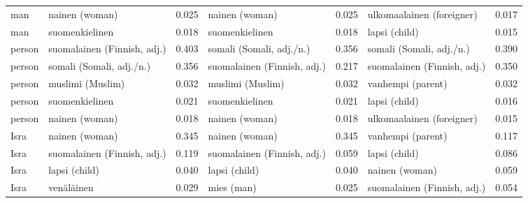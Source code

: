 \begin{longtable}{llrlrlr}
    man &              nainen (woman) &                            0.025 &              nainen (woman) &                                 0.025 &   ulkomaalainen (foreigner) &                           0.017 \\
    man &              suomenkielinen &                            0.018 &              suomenkielinen &                                 0.018 &               lapsi (child) &                           0.015 \\
 person & suomalainen (Finnish, adj.) &                            0.403 &    somali (Somali, adj./n.) &                                 0.356 &    somali (Somali, adj./n.) &                           0.390 \\
 person &    somali (Somali, adj./n.) &                            0.356 & suomalainen (Finnish, adj.) &                                 0.217 & suomalainen (Finnish, adj.) &                           0.350 \\
 person &            muslimi (Muslim) &                            0.032 &            muslimi (Muslim) &                                 0.032 &           vanhempi (parent) &                           0.032 \\
 person &              suomenkielinen &                            0.021 &              suomenkielinen &                                 0.021 &               lapsi (child) &                           0.016 \\
 person &              nainen (woman) &                            0.018 &              nainen (woman) &                                 0.018 &   ulkomaalainen (foreigner) &                           0.015 \\
   Isra &              nainen (woman) &                            0.345 &              nainen (woman) &                                 0.345 &           vanhempi (parent) &                           0.117 \\
   Isra & suomalainen (Finnish, adj.) &                            0.119 & suomalainen (Finnish, adj.) &                                 0.059 &               lapsi (child) &                           0.086 \\
   Isra &               lapsi (child) &                            0.040 &               lapsi (child) &                                 0.040 &              nainen (woman) &                           0.059 \\
   Isra &                  venäläinen &                            0.029 &                  mies (man) &                                 0.025 & suomalainen (Finnish, adj.) &                           0.054 \\

\end{longtable}

